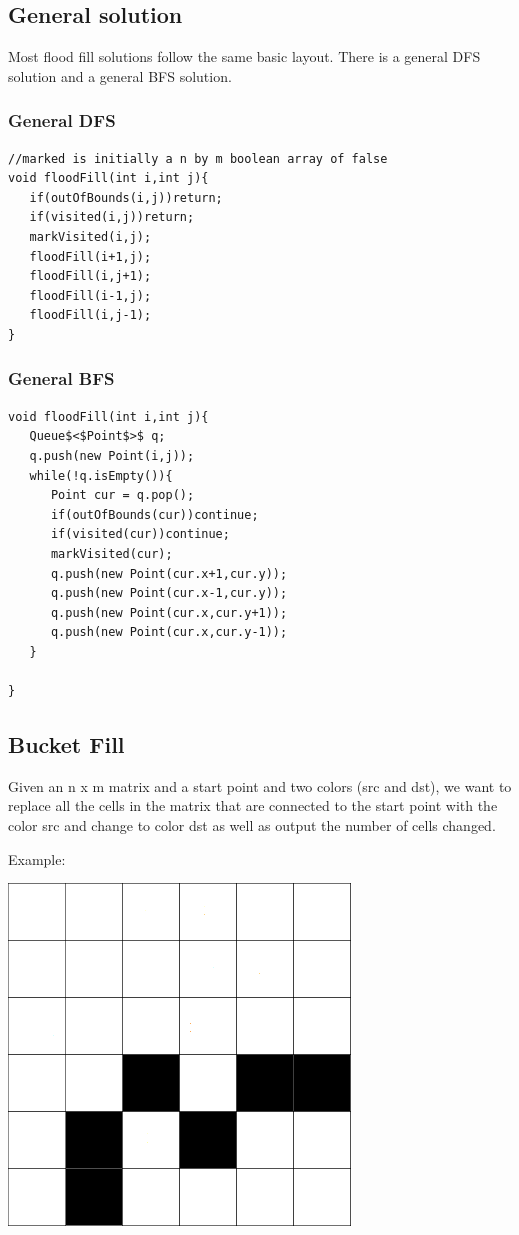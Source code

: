 \documentclass[11pt,oneside]{book}
\makeatletter
\def\maxwidth#1{\ifdim\Gin@nat@width>#1 #1\else\Gin@nat@width\fi}
\makeatother
\begin{document}
\subsection{General solution}

Most flood fill solutions follow the same basic layout. There is a general DFS solution and a general BFS solution.

\subsubsection{General DFS}

\begin{lstlisting}
//marked is initially a n by m boolean array of false
void floodFill(int i,int j){
   if(outOfBounds(i,j))return;
   if(visited(i,j))return;
   markVisited(i,j);
   floodFill(i+1,j);
   floodFill(i,j+1);
   floodFill(i-1,j);
   floodFill(i,j-1);
}
\end{lstlisting}

\subsubsection{General BFS}

\begin{lstlisting}
void floodFill(int i,int j){
   Queue$<$Point$>$ q;
   q.push(new Point(i,j));
   while(!q.isEmpty()){
      Point cur = q.pop();
      if(outOfBounds(cur))continue;
      if(visited(cur))continue;
      markVisited(cur);
      q.push(new Point(cur.x+1,cur.y));
      q.push(new Point(cur.x-1,cur.y));
      q.push(new Point(cur.x,cur.y+1));
      q.push(new Point(cur.x,cur.y-1));
   }
   
}
\end{lstlisting}

\subsection{Bucket Fill}

Given an n x m matrix and a start point and two colors (src and dst), we want to replace all the cells in the matrix that are connected to the start point with the color src and change to color dst as well as output the number of cells changed.

Example:

\includegraphics[width=\maxwidth{\textwidth}]{bucket.png}
\end{document}

